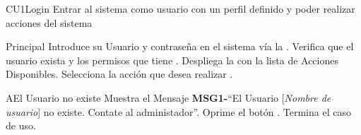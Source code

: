 
% 



	\begin{UseCase}{CU1}{Login}{
		Entrar al sistema como usuario con un perfil definido y poder realizar acciones del sistema
	}
	\end{UseCase}

	\begin{UCtrayectoria}{Principal}
		\UCpaso[\UCactor] Introduce su Usuario y contraseña en el sistema vía la  \label{CU1Login}.
		\UCpaso Verifica que el usuario exista y los permisos que tiene .
		\UCpaso Despliega la  con la lista de Acciones Disponibles.
		\UCpaso[\UCactor] Selecciona la acción que desea realizar \label{CU2Login}.		
	\end{UCtrayectoria}
		
		\begin{UCtrayectoriaA}{A}{El Usuario no existe}
			\UCpaso Muestra el Mensaje {\bf MSG1-}``El Usuario [{\em Nombre de usuario}] no existe. Contate al administador''.
			\UCpaso[\UCactor] Oprime el botón .
			\UCpaso[] Termina el caso de uso.
		\end{UCtrayectoriaA}
		
